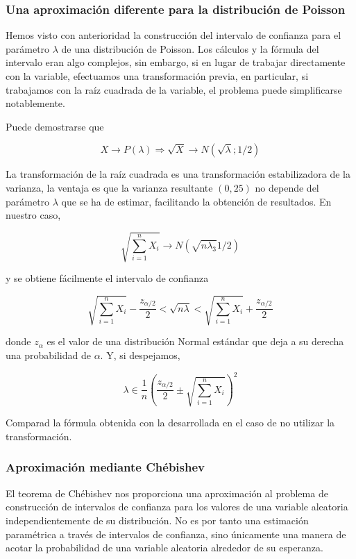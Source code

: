 \documentclass[
]{article}
\begin{document}
\subsubsection{Una aproximación diferente para la distribución de Poisson}\label{una-aproximaciuxf3n-diferente-para-la-distribuciuxf3n-de-poisson}

Hemos visto con anterioridad la construcción del intervalo de confianza para el parámetro \(\lambda\) de una distribución de Poisson. Los cálculos y la fórmula del intervalo eran algo complejos, sin embargo, si en lugar de trabajar directamente con la variable, efectuamos una transformación previa, en particular, si trabajamos con la raíz cuadrada de la variable, el problema puede simplificarse notablemente.

Puede demostrarse que

\[
X \rightarrow P(\lambda) \Rightarrow \sqrt{X} \rightarrow N(\sqrt{\lambda} ; 1 / 2)
\]

La transformación de la raíz cuadrada es una transformación estabilizadora de la varianza, la ventaja es que la varianza resultante \((0,25)\) no depende del parámetro \(\lambda\) que se ha de estimar, facilitando la obtención de resultados. En nuestro caso,

\[
\sqrt{\sum_{i=1}^{n} X_{i}} \rightarrow N\left(\sqrt{n \lambda_{3}} 1 / 2\right)
\]

y se obtiene fácilmente el intervalo de confianza

\[
\sqrt{\sum_{i=1}^{n} X_{i}}-\frac{z_{\alpha / 2}}{2}<\sqrt{n \lambda}<\sqrt{\sum_{i=1}^{n} X_{i}}+\frac{z_{\alpha / 2}}{2}
\]

donde \(z_{\alpha}\) es el valor de una distribución Normal estándar que deja a su derecha una probabilidad de \(\alpha\).
Y, si despejamos,

\[
\lambda \in \frac{1}{n}\left(\frac{z_{\alpha / 2}}{2} \pm \sqrt{\sum_{i=1}^{n} X_{i}}\right)^{2}
\]

Comparad la fórmula obtenida con la desarrollada en el caso de no utilizar la transformación.

\subsubsection{Aproximación mediante Chébishev}\label{aproximaciuxf3n-mediante-chuxe9bishev}

El teorema de Chébishev nos proporciona una aproximación al problema de construcción de intervalos de confianza para los valores de una variable aleatoria independientemente de su distribución. No es por tanto una estimación paramétrica a través de intervalos de confianza, sino únicamente una manera de acotar la probabilidad de una variable aleatoria alrededor de su esperanza.
\end{document}
